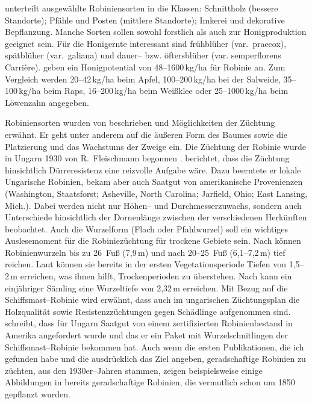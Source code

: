 \documentclass[twocolumn]{scrartcl}
\begin{document}
\citet{keresztesi1983robinie} unterteilt ausgewählte Robiniensorten in
die Klassen: Schnittholz (bessere Standorte); Pfähle und Posten
(mittlere Standorte); Imkerei und dekorative Bepflanzung. Manche
Sorten sollen sowohl forstlich als auch zur Honigproduktion geeignet
sein. Für die Honigernte interessant sind frühblüher (var.\ praecox),
spätblüher (var.\ galiana) und dauer-- bzw. öftersblüher
(var. semperflorens Carrière). \citet[S.~80]{crane1986honig} geben ein
Honigpotential von 48--1600\,kg/ha für Robinie an. Zum Vergleich werden
20--42\,kg/ha beim Apfel, 100--200\,kg/ha bei der Salweide,
35--100\,kg/ha beim Raps, 16--200\,kg/ha beim Weißklee oder
25--1000\,kg/ha beim Löwenzahn angegeben.

Robiniensorten wurden von \citet{vilmos1908robiniensorten} beschrieben
und Möglichkeiten der Züchtung erwähnt. Er geht unter anderem auf die
äußeren Form des Baumes sowie die Platzierung und das Wachstums der
Zweige ein.
Die Züchtung der Robinie wurde in Ungarn 1930 von R.~Fleischmann
begonnen \citep{keresztesi1983robinie}. \citet{fleischmann1933robinie}
berichtet, dass die Züchtung hinsichtlich Dürreresistenz eine
reizvolle Aufgabe wäre. Dazu beerntete er lokale Ungarische Robinien,
bekam aber auch Saatgut von amerikanische Provenienzen (Washington,
Staatsforst; Asheville, North Carolina; Jarfield, Ohio; East Lansing,
Mich.). %
Dabei werden nicht nur Höhen-- und Durchmesserzuwachs, sondern auch
Unterschiede hinsichtlich der Dornenlänge zwischen der verschiedenen
Herkünften beobachtet.
Auch die Wurzelform (Flach oder Pfahlwurzel) soll ein wichtiges Auslesemoment
für die Robiniezüchtung für trockene Gebiete sein.
Nach \citet{bunger1938robinieWurzeltiefe} können Robinienwurzeln
bis zu 26~Fuß (7{,}9\,m) und nach
\citet[S.~424]{harlow2000dendrology} 20--25~Fuß (6,1--7,2\,m) tief reichen.
Laut \citet{lyr1967wurzel}
können sie bereits in der ersten Vegetationsperiode Tiefen von
1{,}5--2\,m erreichen, was ihnen hilft, Trockenperioden zu überstehen.
Nach \citet[S.~38]{bluemke1955robinie} kann ein einjähriger Sämling eine
Wurzeltiefe von 2,32\,m erreichen.
Mit Bezug auf die
Schiffsmast--Robinie \citep{raber1936shipmast} wird erwähnt, dass auch im
ungarischen Züchtungsplan die Holzqualität sowie Resistenzzüchtungen gegen
Schädlinge aufgenommen sind. \citet{mihalyi1937robinie} schreibt, dass für Ungarn
Saatgut von einem zertifizierten Robinienbestand in Amerika angefordert wurde
und das er ein Paket mit Wurzelschnitlingen der Schiffsmast--Robinie bekommen
hat.
Auch wenn die ersten Publikationen, die ich gefunden habe und die
ausdrücklich das Ziel angeben, geradschaftige Robinien zu züchten, aus den
1930er--Jahren stammen, zeigen beispielsweise einige Abbildungen in
\citet{vadas1911robinie} bereits geradschaftige Robinien, die vermutlich schon um
1850 gepflanzt wurden.
\end{document}
